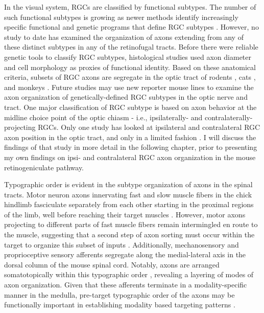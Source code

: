 In the visual system, RGCs are classified by functional subtypes.
The number of such functional subtypes is growing as newer methods identify increasingly specific functional and genetic programs that define RGC subtypes \cite{baden2016functional,rivlin2011transgenic}.
However, no study to date has examined the organization of axons extending from any of these distinct subtypes in any of the retinofugal tracts.
Before there were reliable genetic tools to classify RGC subtypes, histological studies used axon diameter and cell morphology as proxies of functional identity.
Based on these anatomical criteria, subsets of RGC axons are segregate in the optic tract of rodents \cite{reese1987distributionrat}, cats \cite{guillery1982arrangement,torrealba1982studies}, and monkeys \cite{reese1990fibre}.
Future studies may use new reporter mouse lines to examine the axon organization of genetically-defined RGC subtypes in the optic nerve and tract.
One major classification of RGC subtype is based on axon behavior at the midline choice point of the optic chiasm - i.e., ipsilaterally- and contralaterally-projecting RGCs.
Only one study has looked at ipsilateral and contralateral RGC axon position in the optic tract, and only in a limited fashion \cite{godement1984prenatal}.
I will discuss the findings of that study in more detail in the following chapter, prior to presenting my own findings on ipsi- and contralateral RGC axon organization in the mouse retinogeniculate pathway.

Typographic order is evident in the subtype organization of axons in the spinal tracts.
Motor neuron axons innervating fast and slow muscle fibers in the chick hindlimb fasciculate separately from each other starting in the proximal regions of the limb, well before reaching their target muscles \cite{milner1998selective}.
However, motor axons projecting to different parts of fast muscle fibers remain intermingled en route to the muscle, suggesting that a second step of axon sorting must occur within the target to organize this subset of inputs \cite{milner1998selective}.
Additionally, mechanosensory and proprioceptive sensory afferents segregate along the medial-lateral axis in the dorsal column of the mouse spinal cord.
Notably, axons are arranged somatotopically within this typographic order \cite{niu2013modality}, revealing a layering of modes of axon organization.
Given that these afferents terminate in a modality-specific manner in the medulla, pre-target typographic order of the axons may be functionally important in establishing modality based targeting patterns \cite{niu2013modality}.

